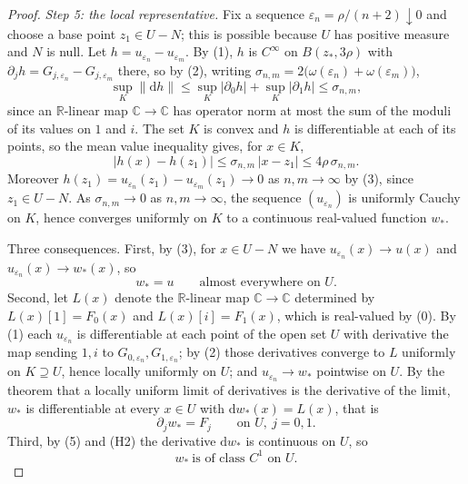 \begin{proof}
\emph{Step 5: the local representative.}  Fix a sequence
$\varepsilon_n=\rho/(n+2)\downarrow0$ and choose a base point $z_1\in U-N$;
this is possible because $U$ has positive measure and $N$ is null.  Let
$h=u_{\varepsilon_n}-u_{\varepsilon_m}$.  By (1), $h$ is $C^\infty$ on
$B(z_*,3\rho)$ with $\partial_jh=G_{j,\varepsilon_n}-G_{j,\varepsilon_m}$
there, so by (2), writing
$\sigma_{n,m}=2\bigl(\omega(\varepsilon_n)+\omega(\varepsilon_m)\bigr)$,
\[
  \sup_{K}\bigl\|\mathrm{d}h\bigr\|
  \le\sup_{K}\bigl|\partial_0h\bigr|+\sup_{K}\bigl|\partial_1h\bigr|
  \le\sigma_{n,m},
\]
since an $\mathbb{R}$-linear map $\mathbb{C}\to\mathbb{C}$ has operator norm at
most the sum of the moduli of its values on $1$ and $i$.  The set $K$ is convex
and $h$ is differentiable at each of its points, so the mean value inequality
gives, for $x\in K$,
\[
  \bigl|h(x)-h(z_1)\bigr|\le\sigma_{n,m}\,|x-z_1|\le4\rho\,\sigma_{n,m}.
\]
Moreover $h(z_1)=u_{\varepsilon_n}(z_1)-u_{\varepsilon_m}(z_1)\to0$ as
$n,m\to\infty$ by (3), since $z_1\in U-N$.  As $\sigma_{n,m}\to0$ as
$n,m\to\infty$, the sequence $(u_{\varepsilon_n})$ is uniformly Cauchy on $K$,
hence converges uniformly on $K$ to a continuous real-valued function $w_*$.

Three consequences.  First, by (3), for $x\in U-N$ we have
$u_{\varepsilon_n}(x)\to u(x)$ and $u_{\varepsilon_n}(x)\to w_*(x)$, so
\begin{equation}\tag{4}
  w_*=u\qquad\text{almost everywhere on }U .
\end{equation}
Second, let $L(x)$ denote the $\mathbb{R}$-linear map $\mathbb{C}\to\mathbb{C}$
determined by $L(x)[1]=F_0(x)$ and $L(x)[i]=F_1(x)$, which is real-valued by
(0).  By (1) each $u_{\varepsilon_n}$ is differentiable at each point of the
open set $U$ with derivative the map sending $1,i$ to
$G_{0,\varepsilon_n},G_{1,\varepsilon_n}$; by (2) those derivatives converge to
$L$ uniformly on $K\supseteq U$, hence locally uniformly on $U$; and
$u_{\varepsilon_n}\to w_*$ pointwise on $U$.  By the theorem that a locally
uniform limit of derivatives is the derivative of the limit, $w_*$ is
differentiable at every $x\in U$ with $\mathrm{d}w_*(x)=L(x)$, that is
\begin{equation}\tag{5}
  \partial_jw_*=F_j\qquad\text{on }U,\ j=0,1 .
\end{equation}
Third, by (5) and (H2) the derivative $\mathrm{d}w_*$ is continuous on $U$, so
\begin{equation}\tag{6}
  w_*\ \text{is of class }C^1\text{ on }U .
\end{equation}


\end{proof}
